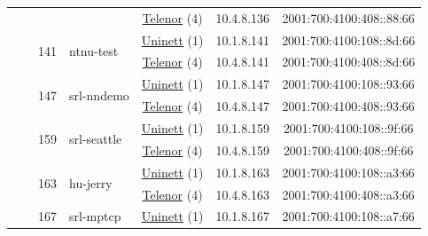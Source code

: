 \begin{small}
\begin{center}
\begin{longtable}{|c|c|c|c|c|c|c|c|}
  &  &  &  & \multicolumn{2}{|c|}{\tiny{\href{https://www.telenor.no}{Telenor} (4)}} & \tiny{10.4.8.136} & \tiny{2001:700:4100:408::88:66} \\* \cline{3-3}\cline{4-4}\cline{5-5}\cline{6-6}\cline{7-7}\cline{8-8}
  &  & \multirow{2}{*}{\tiny{141}} & \multicolumn{1}{|l|}{\multirow{2}{*}{\tiny{ntnu-test}}} & \multicolumn{2}{|c|}{\tiny{\href{https://www.uninett.no}{Uninett} (1)}} & \tiny{10.1.8.141} & \tiny{2001:700:4100:108::8d:66} \\* \cline{5-5}\cline{6-6}\cline{7-7}\cline{8-8}
  &  &  &  & \multicolumn{2}{|c|}{\tiny{\href{https://www.telenor.no}{Telenor} (4)}} & \tiny{10.4.8.141} & \tiny{2001:700:4100:408::8d:66} \\* \cline{3-3}\cline{4-4}\cline{5-5}\cline{6-6}\cline{7-7}\cline{8-8}
  &  & \multirow{2}{*}{\tiny{147}} & \multicolumn{1}{|l|}{\multirow{2}{*}{\tiny{srl-nndemo}}} & \multicolumn{2}{|c|}{\tiny{\href{https://www.uninett.no}{Uninett} (1)}} & \tiny{10.1.8.147} & \tiny{2001:700:4100:108::93:66} \\* \cline{5-5}\cline{6-6}\cline{7-7}\cline{8-8}
  &  &  &  & \multicolumn{2}{|c|}{\tiny{\href{https://www.telenor.no}{Telenor} (4)}} & \tiny{10.4.8.147} & \tiny{2001:700:4100:408::93:66} \\* \cline{3-3}\cline{4-4}\cline{5-5}\cline{6-6}\cline{7-7}\cline{8-8}
  &  & \multirow{2}{*}{\tiny{159}} & \multicolumn{1}{|l|}{\multirow{2}{*}{\tiny{srl-seattle}}} & \multicolumn{2}{|c|}{\tiny{\href{https://www.uninett.no}{Uninett} (1)}} & \tiny{10.1.8.159} & \tiny{2001:700:4100:108::9f:66} \\* \cline{5-5}\cline{6-6}\cline{7-7}\cline{8-8}
  &  &  &  & \multicolumn{2}{|c|}{\tiny{\href{https://www.telenor.no}{Telenor} (4)}} & \tiny{10.4.8.159} & \tiny{2001:700:4100:408::9f:66} \\* \cline{3-3}\cline{4-4}\cline{5-5}\cline{6-6}\cline{7-7}\cline{8-8}
  &  & \multirow{2}{*}{\tiny{163}} & \multicolumn{1}{|l|}{\multirow{2}{*}{\tiny{hu-jerry}}} & \multicolumn{2}{|c|}{\tiny{\href{https://www.uninett.no}{Uninett} (1)}} & \tiny{10.1.8.163} & \tiny{2001:700:4100:108::a3:66} \\* \cline{5-5}\cline{6-6}\cline{7-7}\cline{8-8}
  &  &  &  & \multicolumn{2}{|c|}{\tiny{\href{https://www.telenor.no}{Telenor} (4)}} & \tiny{10.4.8.163} & \tiny{2001:700:4100:408::a3:66} \\* \cline{3-3}\cline{4-4}\cline{5-5}\cline{6-6}\cline{7-7}\cline{8-8}
  &  & \multirow{2}{*}{\tiny{167}} & \multicolumn{1}{|l|}{\multirow{2}{*}{\tiny{srl-mptcp}}} & \multicolumn{2}{|c|}{\tiny{\href{https://www.uninett.no}{Uninett} (1)}} & \tiny{10.1.8.167} & \tiny{2001:700:4100:108::a7:66} \\* \cline{5-5}\cline{6-6}\cline{7-7}\cline{8-8}

\end{longtable}
\end{center}
\end{small}
